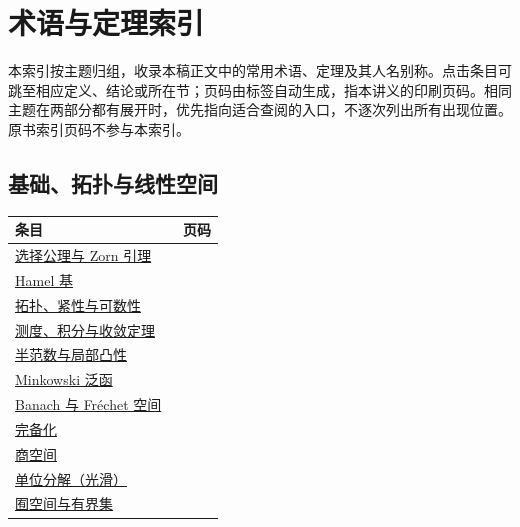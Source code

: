 \chapter{术语与定理索引}\label{back:index}
本索引按主题归组，收录本稿正文中的常用术语、定理及其人名别称。点击条目可跳至相应定义、结论或所在节；页码由标签自动生成，指本讲义的印刷页码。相同主题在两部分都有展开时，优先指向适合查阅的入口，不逐次列出所有出现位置。原书索引页码不参与本索引。

\section*{基础、拓扑与线性空间}
\begin{longtable}{p{0.80\linewidth}r}
\toprule 条目 & 页码\\\midrule\endhead
\hyperref[thm:y0-choice-equivalence]{选择公理与 Zorn 引理} & \pageref{thm:y0-choice-equivalence}\\
\hyperref[thm:y0-hamel-basis]{Hamel 基} & \pageref{thm:y0-hamel-basis}\\
\hyperref[sec:yosida-00-02]{拓扑、紧性与可数性} & \pageref{sec:yosida-00-02}\\
\hyperref[sec:yosida-00-03]{测度、积分与收敛定理} & \pageref{sec:yosida-00-03}\\
\hyperref[sec:yosida-01-01]{半范数与局部凸性} & \pageref{sec:yosida-01-01}\\
\hyperref[thm:y1-gauge]{Minkowski 泛函} & \pageref{thm:y1-gauge}\\
\hyperref[sec:yosida-01-09]{Banach 与 Fréchet 空间} & \pageref{sec:yosida-01-09}\\
\hyperref[sec:yosida-01-10]{完备化} & \pageref{sec:yosida-01-10}\\
\hyperref[sec:yosida-01-11]{商空间} & \pageref{sec:yosida-01-11}\\
\hyperref[sec:yosida-01-12]{单位分解（光滑）} & \pageref{sec:yosida-01-12}\\
\hyperref[sec:yosida-01-07]{囿空间与有界集} & \pageref{sec:yosida-01-07}\\
\bottomrule
\end{longtable}

